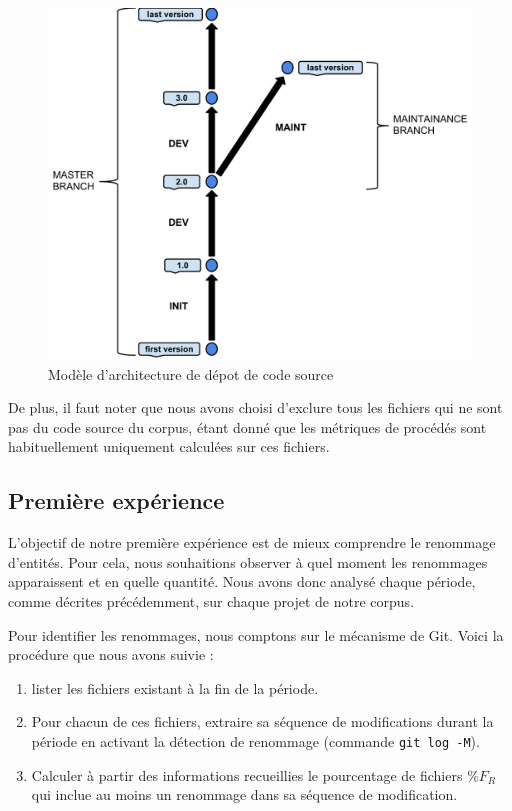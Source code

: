 \begin{figure}[h]
  \centering
  \includegraphics[scale=0.5]{data/figures/periods.pdf}
	\caption{Modèle d'architecture de dépot de code source}
	\label{fig:model}
\end{figure}

De plus, il faut noter que nous avons choisi d'exclure tous les fichiers qui ne sont pas du code source du corpus, étant donné que les métriques de procédés sont habituellement uniquement calculées sur ces fichiers. \\

\subsection{Première expérience}

 L'objectif de notre première expérience est de mieux comprendre le renommage d'entités. Pour cela, nous souhaitions observer à quel moment les renommages apparaissent et en quelle quantité. Nous avons donc analysé chaque période, comme décrites précédemment, sur chaque projet de notre corpus. 

Pour identifier les renommages, nous comptons sur le mécanisme de Git. Voici la procédure que nous avons suivie :
\begin{enumerate}
\item lister les fichiers existant à la fin de la période.
\item Pour chacun de ces fichiers, extraire sa séquence de modifications durant la période en activant la détection de renommage (commande \texttt{git log -M}).
\item Calculer à partir des informations recueillies le pourcentage de fichiers $\%F_{R}$ qui inclue au moins un renommage dans sa séquence de modification.
\end{enumerate}
\medskip

